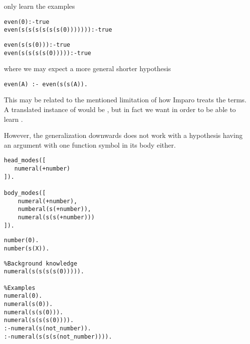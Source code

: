 only learn the examples

\begin{minipage}[t]{.45\textwidth}
\begin{lstlisting}
even(0):-true
even(s(s(s(s(s(s(0))))))):-true
\end{lstlisting}
\end{minipage}
\begin{minipage}[t]{.20\textwidth}
\begin{lstlisting}
even(s(s(0))):-true
even(s(s(s(s(0))))):-true
\end{lstlisting}
\end{minipage}


where we may expect a more general shorter hypothesis

\begin{lstlisting}
even(A) :- even(s(s(A)).
\end{lstlisting}
This may be related to the mentioned limitation of how Imparo treats the terms. A translated instance of  would be
, but in fact we want  in order to be able to learn
.

However, the generalization downwards does not work with a hypothesis having an argument with one function symbol in its body either.

\begin{minipage}[t]{.30\textwidth}
\begin{lstlisting}
head_modes([
   numeral(+number)
]).

body_modes([
    numeral(+number),
    numberal(s(+number)),
    numeral(s(s(+number)))
]).
\end{lstlisting}
\end{minipage}
\begin{minipage}[t]{.20\textwidth}
\begin{lstlisting}
number(0).
number(s(X)).

\end{lstlisting}
\end{minipage}
\begin{minipage}[t]{.30\textwidth}
\begin{lstlisting}
%Background knowledge
numeral(s(s(s(s(0))))).

%Examples
numeral(0).
numeral(s(0)).
numeral(s(s(0))).
numeral(s(s(s(0)))).
:-numeral(s(not_number)).
:-numeral(s(s(s(not_number)))).                                   
\end{lstlisting}
\end{minipage}


